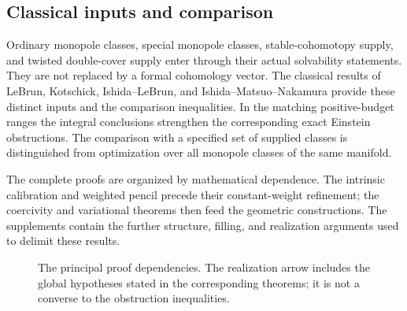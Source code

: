 \documentclass[10pt,a4paper]{article}
\theoremstyle{definition}
\theoremstyle{remark}
\numberwithin{equation}{section}
\begin{document}
\subsection{Classical inputs and comparison}
Ordinary monopole classes, special monopole classes, stable-cohomotopy
supply, and twisted double-cover supply enter through their actual
solvability statements. They are not replaced by a formal cohomology
vector. The classical results of LeBrun, Kotschick, Ishida--LeBrun, and
Ishida--Matsuo--Nakamura provide these distinct inputs and the comparison
inequalities. In the matching positive-budget ranges the integral
conclusions strengthen the corresponding exact Einstein obstructions.
The comparison with a specified set of supplied classes is distinguished
from optimization over all monopole classes of the same manifold.

The complete proofs are organized by mathematical dependence. The
intrinsic calibration and weighted pencil precede their constant-weight
refinement; the coercivity and variational theorems then feed the
geometric constructions. The supplements contain the further structure,
filling, and realization arguments used to delimit these results.
\begin{figure}[ht]
\centering
{}
\caption{The principal proof dependencies. The realization arrow includes
the global hypotheses stated in the corresponding theorems; it is not
a converse to the obstruction inequalities.}
\end{figure}
\clearpage
\end{document}
